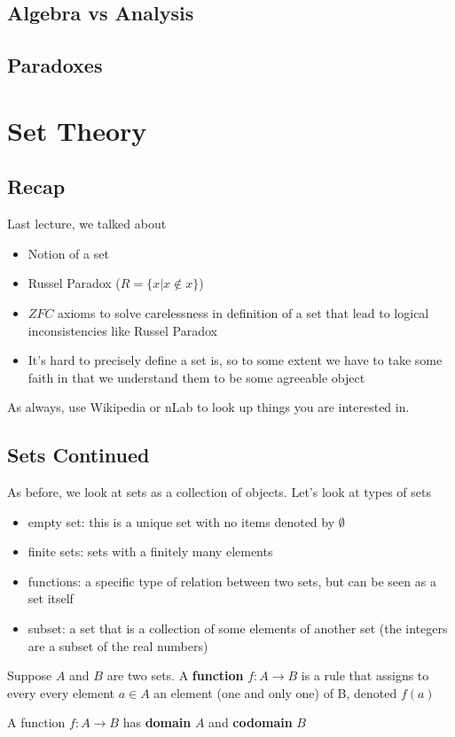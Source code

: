 \documentclass{report}
\begin{document}
\section{Algebra vs Analysis}

\section{Paradoxes}

\chapter{Set Theory}
\section{Recap}
Last lecture, we talked about
\begin{itemize}
    \item Notion of a set
    \item Russel Paradox ($R = \{x|x \notin x\}$)
    \item $ZFC$ axioms to solve carelessness in definition of a set that lead to logical inconsistencies like Russel Paradox
    \item It's hard to precisely define a set is, so to some extent we have to take some faith in that we understand them to be some agreeable object
\end{itemize}
As always, use Wikipedia or nLab to look up things you are interested in.

\section{Sets Continued}
As before, we look at sets as a collection of objects. Let's look at types of sets
\begin{itemize}
    \item empty set: this is a unique set with no items denoted by $\emptyset$
    \item finite sets: sets with a finitely many elements
    \item functions: a specific type of relation between two sets, but can be seen as a set itself
    \item subset: a set that is a collection of some elements of another set (the integers are a subset of the real numbers)
\end{itemize}

\theoremstyle{definition}
\begin{definition}
    Suppose $A$ and $B$ are two sets. A \textbf{function} $f: A \rightarrow B$ is a rule that assigns to every every element $a \in A$ an element (one and only one) of B, denoted $f(a)$
\end{definition}
\begin{definition}
    A function $f: A \rightarrow B$ has \textbf{domain} $A$ and \textbf{codomain} $B$
\end{definition}
\end{document}
